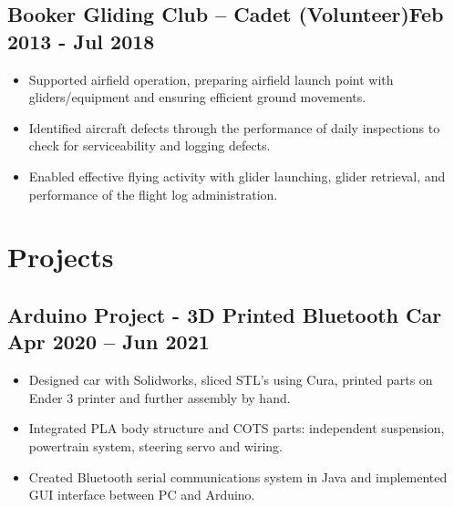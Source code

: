 \documentclass[a4paper,9pt]{article}
\begin{document}
\subsection*{\textbf{Booker Gliding Club – Cadet (Volunteer)}\hfill Feb 2013 - Jul 2018}
\begin{itemize}[noitemsep]

	\item Supported airfield operation, preparing airfield launch point with gliders/equipment and ensuring efficient ground movements.
	\item Identified aircraft defects through the performance of daily inspections to check for serviceability and logging defects.
	\item Enabled effective flying activity with glider launching, glider retrieval, and performance of the flight log administration.
\end{itemize}


\section*{Projects}

%
%
%
%

\subsection*{\textbf{Arduino Project - 3D Printed Bluetooth Car } \hfill  Apr 2020 – Jun 2021}
\begin{itemize}[noitemsep]
	\item  Designed car with Solidworks, sliced STL's using Cura, printed parts on Ender 3 printer and further assembly by hand.
	\item  Integrated PLA body structure and COTS parts: independent suspension, powertrain system, steering servo and wiring.
	\item  Created Bluetooth serial communications system in Java and implemented GUI interface between PC and Arduino.


\end{itemize}
\end{document}

